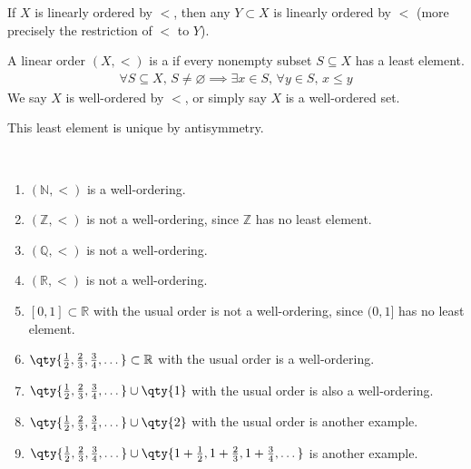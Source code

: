 \begin{note}
    If $X$ is linearly ordered by $<$, then any $Y \subset X$ is linearly ordered by $<$ (more precisely the restriction of $<$ to $Y$).
\end{note}

\begin{definition}
    A linear order $(X, <)$ is a  if every nonempty subset $S \subseteq X$ has a least element.
    \begin{align*}
       \forall S \subseteq X,\, S \neq \varnothing \implies \exists x \in S,\, \forall y \in S,\, x \leq y
    \end{align*}
    We say $X$ is well-ordered by $<$, or simply say $X$ is a well-ordered set.
\end{definition}

\begin{note}
    This least element is unique by antisymmetry.
\end{note}

\begin{example} ~\vspace*{-1.5\baselineskip}
    \begin{enumerate}
        \item $(\mathbb N, <)$ is a well-ordering.
        \item $(\mathbb Z, <)$ is not a well-ordering, since $\mathbb Z$ has no least element.
        \item $(\mathbb Q, <)$ is not a well-ordering.
        \item $(\mathbb R, <)$ is not a well-ordering.
        \item $[0,1] \subset \mathbb R$ with the usual order is not a well-ordering, since $(0,1]$ has no least element.
        \item $\qty{\frac{1}{2}, \frac{2}{3}, \frac{3}{4}, \dots} \subset \mathbb R$ with the usual order is a well-ordering.
        \item $\qty{\frac{1}{2}, \frac{2}{3}, \frac{3}{4}, \dots} \cup \qty{1}$ with the usual order is also a well-ordering.
        \item $\qty{\frac{1}{2}, \frac{2}{3}, \frac{3}{4}, \dots} \cup \qty{2}$ with the usual order is another example.
        \item $\qty{\frac{1}{2}, \frac{2}{3}, \frac{3}{4}, \dots} \cup \qty{1 + \frac{1}{2}, 1 + \frac{2}{3}, 1 + \frac{3}{4}, \dots}$ is another example.
    \end{enumerate}
\end{example}


